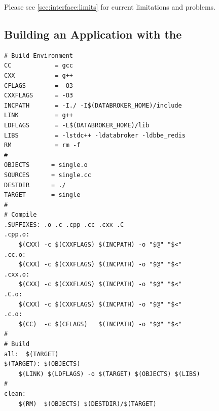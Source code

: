 Please see \ref{sec:interface:limits} for current limitations and
problems.

\subsection{Building an Application with the \databroker}
\begin{lstlisting}[basicstyle=\scriptsize\ttfamily,backgroundcolor=\color{backcolour},caption=Example Makefile,captionpos=b,label=code:Makefile]
# Build Environment
CC            = gcc
CXX           = g++
CFLAGS        = -O3
CXXFLAGS      = -O3
INCPATH       = -I./ -I$(DATABROKER_HOME)/include
LINK          = g++ 
LDFLAGS       = -L$(DATABROKER_HOME)/lib
LIBS          = -lstdc++ -ldatabroker -ldbbe_redis
RM            = rm -f
# 
OBJECTS      = single.o
SOURCES      = single.cc
DESTDIR	     = ./
TARGET       = single
#
# Compile
.SUFFIXES: .o .c .cpp .cc .cxx .C
.cpp.o:
    $(CXX) -c $(CXXFLAGS) $(INCPATH) -o "$@" "$<"
.cc.o:
    $(CXX) -c $(CXXFLAGS) $(INCPATH) -o "$@" "$<"
.cxx.o:
    $(CXX) -c $(CXXFLAGS) $(INCPATH) -o "$@" "$<"
.C.o:
    $(CXX) -c $(CXXFLAGS) $(INCPATH) -o "$@" "$<"
.c.o:
    $(CC)  -c $(CFLAGS)   $(INCPATH) -o "$@" "$<"
# 
# Build 
all:  $(TARGET)
$(TARGET): $(OBJECTS) 
    $(LINK) $(LDFLAGS) -o $(TARGET) $(OBJECTS) $(LIBS)
# 
clean:
    $(RM)  $(OBJECTS) $(DESTDIR)/$(TARGET)
\end{lstlisting}

